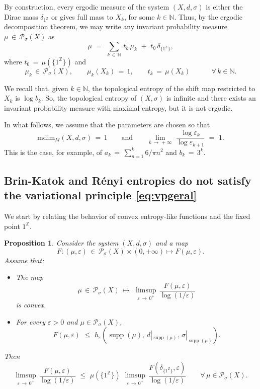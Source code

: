 \documentclass[11pt,a4paper,reqno]{amsart}
\theoremstyle{plain}
\newtheorem{proposition}[theorem]{Proposition}
\theoremstyle{definition}
\newcommand{\field}[1]{\mathbb{#1}}
\newcommand{\ZZ}{\field{Z}}
\newcommand{\NN}{\field{N}}
\newcommand{\ep} {\varepsilon}
\newcommand{\vep}{\varepsilon}
\newcommand{\si} {\sigma}       \newcommand{\Si}{\Sigma}
\newcommand{\cP}{{\mathcal P}}
\newcommand{\supp}{\operatorname{{supp}}}
\begin{document}
By construction, every ergodic measure of the system $(X,d,\si)$ is either the Dirac mass $\delta_{1^\ZZ}$ or gives full mass to $X_k$, for some $k\in\NN$. Thus, by the ergodic decomposition theorem, we may write any invariant probability measure $\mu\,\in\,\cP_\si(X)$ as 
\begin{equation}\label{MeasureDecompositionCaixinhas}
\mu\,\,=\,\,\sum_{k\,\in\,\NN}\, t_k\,\mu_k\,\,+\,\,t_0\,\delta_{\{1^\ZZ\}},
\end{equation}
where $t_0\,=\,\mu(\{1^\ZZ\})$ and 
$$\mu_k\,\in\,\cP_\si(X),\qquad \mu_k(X_k)\,=\,1,\qquad t_k\,=\, \mu(X_k)\qquad\quad\forall\,k\in\NN.$$  

\noindent We recall that, given $k\in\NN$, the topological entropy of the shift map restricted to $X_k$ is $\log b_k$. So, the topological entropy of $(X,\sigma)$ is infinite and there exists an invariant probability measure with maximal entropy, but it is not ergodic.
\smallskip

In what follows, we assume that the parameters are chosen so that 
$$\mathrm{mdim}_M(X,d,\si)\,=\,1 \quad \quad \text{and} \quad \quad 
\lim_{k\,\to\,+\infty} \,\,\frac{\log \ep_k}{\log \ep_{k+1}}\,\,=\,\,1.$$
This is the case, for example, of $a_k\,=\,\sum_{n=1}^k 6/\pi n^2$ and $b_k\,=\,3^k$.



\subsection{Brin-Katok and Rényi entropies do not satisfy the variational principle \eqref{eq:vpgeral}}\label{BKcounterex}

We start by relating the behavior of convex entropy-like functions and the fixed point $1^\ZZ$.

\begin{proposition}\label{prop:conv}
Consider the system $(X,d,\si)$ and a map 
$$F\colon (\mu, \vep) \,\in \, \cP_\sigma(X) \times (0,+\infty) \mapsto F(\mu,\ep).$$
Assume that:
\begin{itemize}
\item[$(i)$] The map 
$$\mu \,\in \, \cP_\sigma(X) \,\longmapsto\,\, \limsup_{\ep\,\to\,0^+}\,\frac{F(\mu,\ep)}{\log(1/\ep)}$$ 
is convex.
\smallskip

\item[$(ii)$]  For every $\vep > 0$ and $\mu \in \cP_\sigma(X)$, 
$$F(\mu,\ep)\,\,\leq\,\,h_\ep(\supp(\mu),\,d|_{\supp(\mu)},\,\si|_{\supp(\mu)}).$$
\end{itemize}

\medskip

\noindent Then 
\begin{equation}\label{eq:convex}
\limsup_{\ep\,\to\,0^+}\,\frac{F(\mu,\ep)}{\log(1/\ep)}\,\,\leq\,\,\mu(\{1^\ZZ\})\,\,\limsup_{\ep\,\to\,0^+}\,\frac{F(\delta_{\{1^\ZZ\}},\ep)}{\log(1/\ep)}\qquad \forall\, \mu\in\cP_\si(X).    
\end{equation}
\end{proposition}
\smallskip
\end{document}
